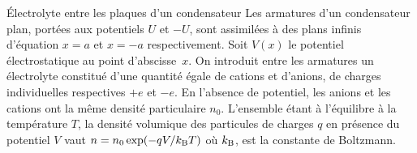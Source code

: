 \begin{exo}[PC][3][TD]{Électrolyte entre les plaques d'un condensateur}
  Les armatures d'un condensateur plan, portées aux potentiels $U$ et $-U$, sont assimilées à des plans infinis d'équation $x=a$ et $x=-a$ respectivement. Soit $V(x)$ le potentiel électrostatique au point d'abscisse~$x$. On introduit entre les armatures un électrolyte constitué d'une quantité égale de cations et d'anions, de charges individuelles respectives $+e$ et $-e$. En l'absence de potentiel, les anions et les cations ont la même densité particulaire $n_0$. L'ensemble étant à l'équilibre à la température $T$, la densité volumique des particules de charges $q$ en présence du potentiel $V$ vaut $n=n_0\exp(-qV/k_{\rm{B}}T)$ où $k_{\rm{B}}$, est la constante de Boltzmann.


\end{exo}
